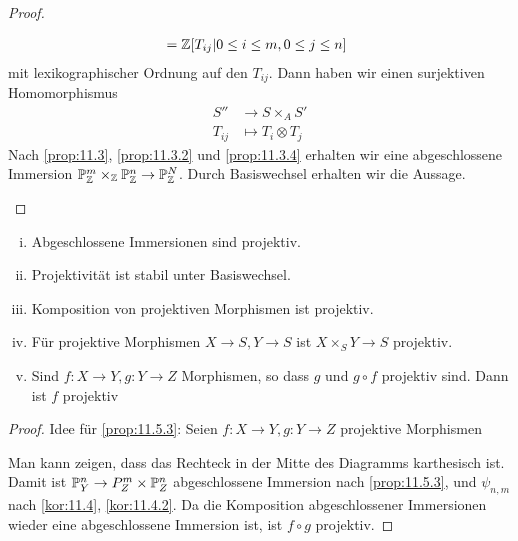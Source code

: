 \begin{kor}
\begin{proof}
\begin{enumerate}[i)]
\begin{align*}
        &\phantom{:}= \Z[T_{ij} | 0 \leq i \leq m, 0 \leq j \leq n ]
      \end{align*}
      mit lexikographischer Ordnung auf den $T_{ij}$. Dann haben wir einen surjektiven Homomorphismus
      \begin{align*}
        S'' &\to S \times_A S'\\
        T_{ij} & \mapsto T_i \otimes T_j
      \end{align*}
      Nach \ref{prop:11.3}, \ref{prop:11.3.2} und \ref{prop:11.3.4} erhalten wir eine abgeschlossene Immersion $\P_\Z^m \times_\Z \P_\Z^n \to \P_\Z^N$. Durch Basiswechsel erhalten wir die Aussage.
    \end{enumerate}
  \end{proof}
\end{kor}

\begin{prop}
  \label{prop:11.5}
  \begin{enumerate}[i)]
  \item\label{prop:11.5.1} Abgeschlossene Immersionen sind projektiv.
  \item\label{prop:11.5.2} Projektivität ist stabil unter Basiswechsel.
  \item\label{prop:11.5.3} Komposition von projektiven Morphismen ist projektiv.
  \item\label{prop:11.5.4} Für projektive Morphismen $X\to S, Y \to S$ ist $X \times_S Y \to S$ projektiv.
  \item\label{prop:11.5.5} Sind $f \colon X \to Y, g \colon Y \to Z$ Morphismen, so dass $g$ und $g \circ f$ projektiv sind. Dann ist $f$ projektiv
  \end{enumerate}
  \begin{proof} Idee für \ref{prop:11.5.3}: Seien $f \colon X \to Y ,g \colon Y \to Z$ projektive Morphismen
    \begin{center}
    \end{center}
    Man kann zeigen, dass das Rechteck in der Mitte des Diagramms karthesisch ist. Damit ist $\P_Y^n \to P_Z^m \times \P_Z^n$ abgeschlossene Immersion nach \ref{prop:11.5.3}, und $\psi_{n,m}$ nach \ref{kor:11.4}, \ref{kor:11.4.2}. Da die Komposition abgeschlossener Immersionen wieder eine abgeschlossene Immersion ist, ist $f \circ g$ projektiv.
  \end{proof}
\end{prop}

